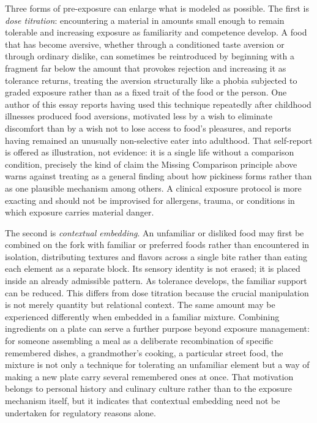 \documentclass[11pt]{article}
\begin{document}
Three forms of pre-exposure can enlarge what is modeled as possible. The first is \emph{dose titration}: encountering a material in amounts small enough to remain tolerable and increasing exposure as familiarity and competence develop. A food that has become aversive, whether through a conditioned taste aversion or through ordinary dislike, can sometimes be reintroduced by beginning with a fragment far below the amount that provokes rejection and increasing it as tolerance returns, treating the aversion structurally like a phobia subjected to graded exposure rather than as a fixed trait of the food or the person. One author of this essay reports having used this technique repeatedly after childhood illnesses produced food aversions, motivated less by a wish to eliminate discomfort than by a wish not to lose access to food's pleasures, and reports having remained an unusually non-selective eater into adulthood. That self-report is offered as illustration, not evidence: it is a single life without a comparison condition, precisely the kind of claim the Missing Comparison principle above warns against treating as a general finding about how pickiness forms rather than as one plausible mechanism among others. A clinical exposure protocol is more exacting and should not be improvised for allergens, trauma, or conditions in which exposure carries material danger.

The second is \emph{contextual embedding}. An unfamiliar or disliked food may first be combined on the fork with familiar or preferred foods rather than encountered in isolation, distributing textures and flavors across a single bite rather than eating each element as a separate block. Its sensory identity is not erased; it is placed inside an already admissible pattern. As tolerance develops, the familiar support can be reduced. This differs from dose titration because the crucial manipulation is not merely quantity but relational context. The same amount may be experienced differently when embedded in a familiar mixture. Combining ingredients on a plate can serve a further purpose beyond exposure management: for someone assembling a meal as a deliberate recombination of specific remembered dishes, a grandmother's cooking, a particular street food, the mixture is not only a technique for tolerating an unfamiliar element but a way of making a new plate carry several remembered ones at once. That motivation belongs to personal history and culinary culture rather than to the exposure mechanism itself, but it indicates that contextual embedding need not be undertaken for regulatory reasons alone.
\end{document}
